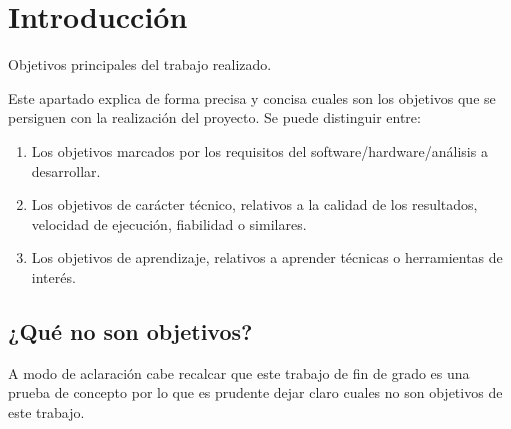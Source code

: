 
\section{Introducción}

Objetivos principales del trabajo realizado.

Este apartado explica de forma precisa y concisa cuales son los objetivos que se persiguen con la realización del proyecto. Se puede distinguir entre:
\begin{enumerate}
    \item Los objetivos marcados por los requisitos del software/hardware/análisis a desarrollar.
    \item Los objetivos de carácter técnico, relativos a la calidad de los resultados, velocidad de ejecución, fiabilidad o similares.
    \item Los objetivos de aprendizaje, relativos a aprender técnicas o herramientas de interés. 
\end{enumerate}

\subsection{¿Qué no son objetivos?}

A modo de aclaración cabe recalcar que este trabajo de fin de grado es una prueba de concepto por lo que es prudente dejar claro cuales no son objetivos de este trabajo.

